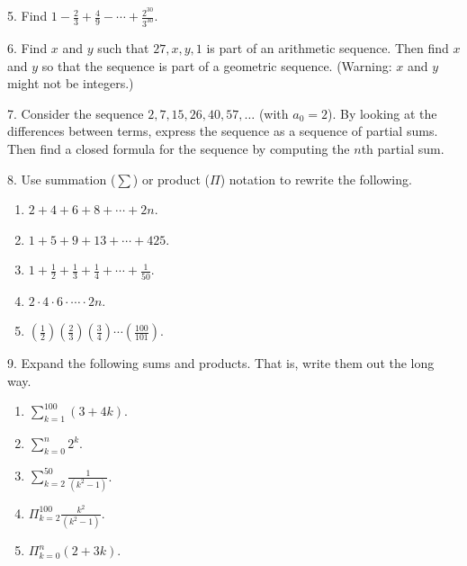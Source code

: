 \documentclass[10pt,]{book}
\theoremstyle{plain}
\theoremstyle{definition}
\theoremstyle{definition}
\theoremstyle{definition}
\numberwithin{equation}{chapter}
\def\d{\displaystyle}
\def\prod{\Pi}
\begin{document}
\begin{exerciselist}
\item[5.]\hypertarget{exercise-149}{}
              Find \(1 - \frac{2}{3} + \frac{4}{9} - \cdots + \frac{2^{30}}{3^{30}}\).
\par\smallskip
\item[6.]\hypertarget{exercise-150}{}
              Find \(x\) and \(y\) such that \(27, x, y, 1\) is part of an arithmetic sequence. Then find \(x\) and \(y\) so that the sequence is part of a geometric sequence. (Warning: \(x\) and \(y\) might not be integers.)
\par\smallskip
\item[7.]\hypertarget{exercise-151}{}
              Consider the sequence \(2, 7, 15, 26, 40, 57, \ldots\) (with \(a_0 = 2\)). By looking at the differences between terms, express the sequence as a sequence of partial sums. Then find a closed formula for the sequence by computing the \(n\)th partial sum.
\par\smallskip
\item[8.]\hypertarget{exercise-152}{}
              Use summation (\(\sum\)) or product (\(\prod\)) notation to rewrite the following.
\leavevmode%
\begin{enumerate}[label=(\alph*)]
\item\hypertarget{li-903}{}\(2 + 4 + 6 + 8 + \cdots + 2n\).%
\item\hypertarget{li-904}{}\(1 + 5 + 9 + 13 + \cdots + 425\).%
\item\hypertarget{li-905}{}\(1 + \frac{1}{2} + \frac{1}{3} + \frac{1}{4} + \cdots + \frac{1}{50}\).%
\item\hypertarget{li-906}{}\(2 \cdot 4 \cdot 6 \cdot \cdots \cdot 2n\).%
\item\hypertarget{li-907}{}\((\frac{1}{2})(\frac{2}{3})(\frac{3}{4})\cdots(\frac{100}{101})\).%
\end{enumerate}
\par\smallskip
\item[9.]\hypertarget{exercise-153}{}
              Expand the following sums and products. That is, write them out the long way.
\leavevmode%
\begin{enumerate}[label=(\alph*)]
\item\hypertarget{li-913}{}\(\d\sum_{k=1}^{100} (3+4k)\).%
\item\hypertarget{li-914}{}\(\d\sum_{k=0}^n 2^k\).%
\item\hypertarget{li-915}{}\(\d\sum_{k=2}^{50}\frac{1}{(k^2 - 1)}\).%
\item\hypertarget{li-916}{}\(\d\prod_{k=2}^{100}\frac{k^2}{(k^2-1)}\).%
\item\hypertarget{li-917}{}\(\d\prod_{k=0}^n (2+3k)\).%
\end{enumerate}
\par\smallskip
\end{exerciselist}
\typeout{************************************************}
\typeout{************************************************}
\end{document}
